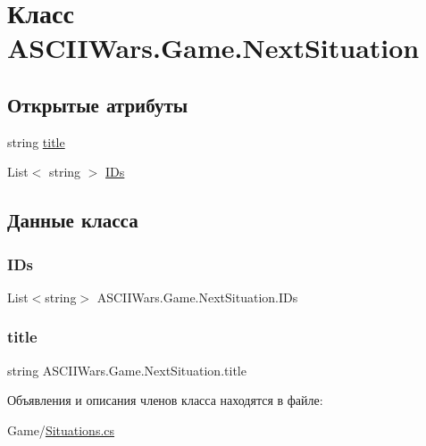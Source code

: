 \hypertarget{class_a_s_c_i_i_wars_1_1_game_1_1_next_situation}{}\section{Класс A\+S\+C\+I\+I\+Wars.\+Game.\+Next\+Situation}
\label{class_a_s_c_i_i_wars_1_1_game_1_1_next_situation}
\subsection*{Открытые атрибуты}
\begin{DoxyCompactItemize}
\item 
string \hyperlink{class_a_s_c_i_i_wars_1_1_game_1_1_next_situation_a5d21d7465e8bb363277591d61759ba1d}{title}
\item 
List$<$ string $>$ \hyperlink{class_a_s_c_i_i_wars_1_1_game_1_1_next_situation_a882f10c3c66963ef3e67c9e30689c968}{I\+Ds}
\end{DoxyCompactItemize}


\subsection{Данные класса}
\hypertarget{class_a_s_c_i_i_wars_1_1_game_1_1_next_situation_a882f10c3c66963ef3e67c9e30689c968}{}\label{class_a_s_c_i_i_wars_1_1_game_1_1_next_situation_a882f10c3c66963ef3e67c9e30689c968} 
\subsubsection{\texorpdfstring{I\+Ds}{IDs}}
{\footnotesize\ttfamily List$<$string$>$ A\+S\+C\+I\+I\+Wars.\+Game.\+Next\+Situation.\+I\+Ds}

\hypertarget{class_a_s_c_i_i_wars_1_1_game_1_1_next_situation_a5d21d7465e8bb363277591d61759ba1d}{}\label{class_a_s_c_i_i_wars_1_1_game_1_1_next_situation_a5d21d7465e8bb363277591d61759ba1d} 
\subsubsection{\texorpdfstring{title}{title}}
{\footnotesize\ttfamily string A\+S\+C\+I\+I\+Wars.\+Game.\+Next\+Situation.\+title}



Объявления и описания членов класса находятся в файле\+:\begin{DoxyCompactItemize}
\item 
Game/\hyperlink{_situations_8cs}{Situations.\+cs}\end{DoxyCompactItemize}
